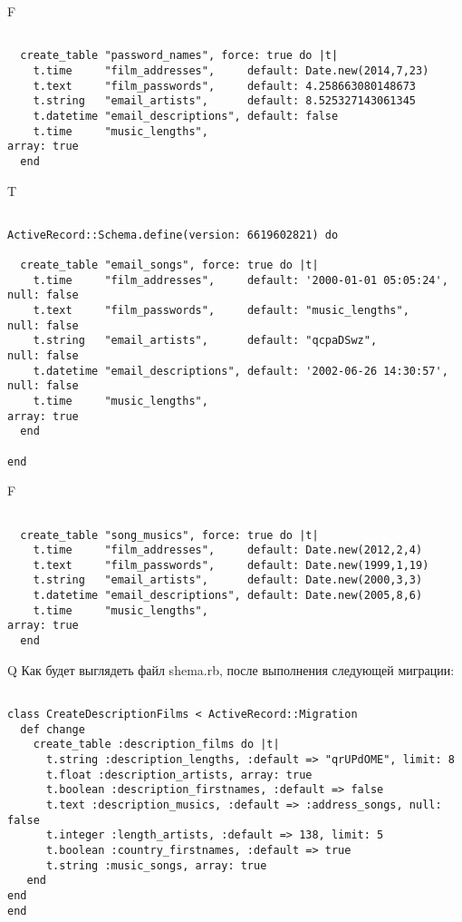 F
\begin{verbatim}

  create_table "password_names", force: true do |t|
    t.time     "film_addresses",     default: Date.new(2014,7,23)
    t.text     "film_passwords",     default: 4.258663080148673
    t.string   "email_artists",      default: 8.525327143061345
    t.datetime "email_descriptions", default: false
    t.time     "music_lengths",                                                   array: true
  end

\end{verbatim}

T
\begin{verbatim}

ActiveRecord::Schema.define(version: 6619602821) do

  create_table "email_songs", force: true do |t|
    t.time     "film_addresses",     default: '2000-01-01 05:05:24', null: false
    t.text     "film_passwords",     default: "music_lengths",       null: false
    t.string   "email_artists",      default: "qcpaDSwz",            null: false
    t.datetime "email_descriptions", default: '2002-06-26 14:30:57', null: false
    t.time     "music_lengths",                                                   array: true
  end

end
\end{verbatim}


F
\begin{verbatim}

  create_table "song_musics", force: true do |t|
    t.time     "film_addresses",     default: Date.new(2012,2,4)
    t.text     "film_passwords",     default: Date.new(1999,1,19)
    t.string   "email_artists",      default: Date.new(2000,3,3)
    t.datetime "email_descriptions", default: Date.new(2005,8,6)
    t.time     "music_lengths",                                                   array: true
  end

\end{verbatim}

Q
Как будет выглядеть файл shema.rb, после выполнения следующей миграции:

\begin{verbatim}

class CreateDescriptionFilms < ActiveRecord::Migration 
  def change 
    create_table :description_films do |t| 
      t.string :description_lengths, :default => "qrUPdOME", limit: 8
      t.float :description_artists, array: true
      t.boolean :description_firstnames, :default => false
      t.text :description_musics, :default => :address_songs, null: false
      t.integer :length_artists, :default => 138, limit: 5
      t.boolean :country_firstnames, :default => true
      t.string :music_songs, array: true
   end
end
end
\end{verbatim}

